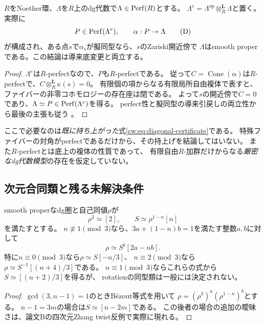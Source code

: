 \begin{proposition}[有限対角証明書によるsaturationの開近傍]
\label{cw:prop:diagonal-certificate}
$R$をNoether環、$\Lambda$を$R$上のdg代数で$\Lambda\in\operatorname{Perf}(R)$とする。
$\Lambda^e=\Lambda^{\mathrm{op}}\otimes_R^{\mathbf L}\Lambda$と置く。
実際に
\[
 P\in\operatorname{Perf}(\Lambda^e),\qquad \alpha:P\to\Lambda
 \tag{D}\label{cw:eq:diagonal-certificate}
\]
が構成され、ある点$s$で$\alpha_s$が擬同型なら、$s$のZariski開近傍で
$\Lambda$はsmooth properである。この結論は導来底変更と両立する。
\end{proposition}
\begin{proof}
$\Lambda^e$は$R$-perfectなので、$P$も$R$-perfectである。
従って$C=\operatorname{Cone}(\alpha)$は$R$-perfectで、$C\otimes_R^{\mathbf L}\kappa(s)=0$。
有限個の項からなる有限局所自由複体で表すと、ファイバーの非零コホモロジーの存在座は閉である。
よって$s$の開近傍で$C=0$であり、$\Lambda\simeq P\in\operatorname{Perf}(\Lambda^e)$を得る。
perfect性と擬同型の導来引戻しの両立性から最後の主張も従う
\cite[Tag 0BDK]{Stacks}。
\end{proof}
\begin{remark}
ここで必要なのは\emph{既に持ち上がった}式\eqref{cw:eq:diagonal-certificate}である。
特殊ファイバーの対角がperfectであるだけから、その持上げを結論してはいない。
また$R$-perfectとは底上の複体の性質であって、
有限自由$R$-加群だけからなる\emph{厳密なdg代数模型}の存在を仮定していない。
\end{remark}

\subsection{次元合同類と残る未解決条件}

\begin{proposition}[Serre関手からのrotationの復元]
\label{prop:all-components-rotation-serre}
smooth properなdg圏と自己同値$\rho$が
\begin{equation}\label{eq:all-components-serre}
 \rho^3\simeq[2],\qquad S\simeq\rho^{1-n}[n]
\end{equation}
を満たすとする。
$n\not\equiv1\pmod3$なら、$3a+(1-n)b=1$を満たす整数$a,b$に対して
\begin{equation}\label{eq:all-components-rotation}
 \rho\simeq S^b[2a-nb].
\end{equation}
特に$n\equiv0\pmod3$なら$\rho\simeq S[-n/3]$、
$n\equiv2\pmod3$なら$\rho\simeq S^{-1}[(n+4)/3]$である。
$n\equiv1\pmod3$ならこれらの式から$S\simeq[(n+2)/3]$を得るが、
rotationの同型類は一般には決定されない。
\end{proposition}
\begin{proof}
$\gcd(3,n-1)=1$のときBézout等式を用いて
$\rho=(\rho^3)^a(\rho^{1-n})^b$とする。
$n-1=3m$の場合は$S\simeq[n-2m]$である。
この後者の場合の追加の曖昧さは、論文Bの四次元Zhang twist反例で実際に現れる。
\end{proof}

